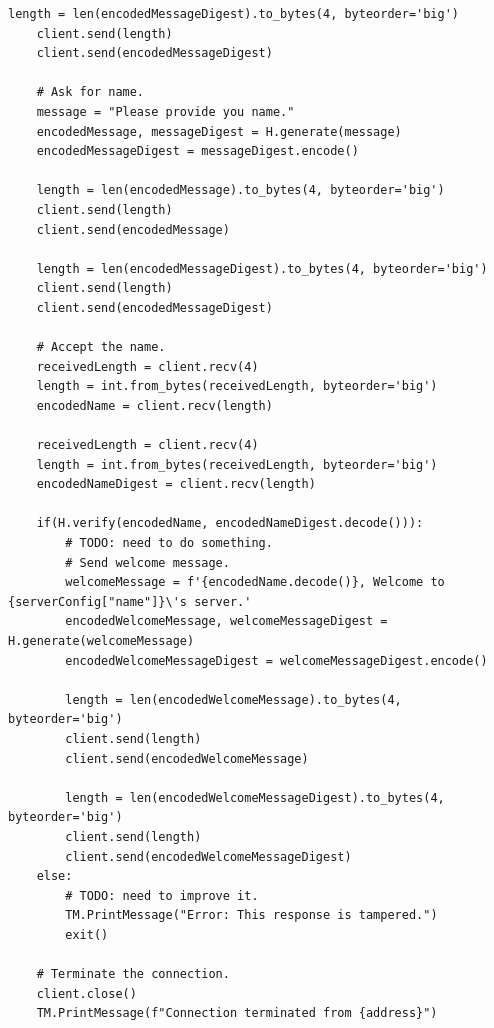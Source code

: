 \begin{lstlisting}[style=mypython, caption={server.py}, label={code:A-2-a-server}]
    length = len(encodedMessageDigest).to_bytes(4, byteorder='big')
    client.send(length)
    client.send(encodedMessageDigest)

    # Ask for name.
    message = "Please provide you name."
    encodedMessage, messageDigest = H.generate(message)
    encodedMessageDigest = messageDigest.encode()

    length = len(encodedMessage).to_bytes(4, byteorder='big')
    client.send(length)
    client.send(encodedMessage)

    length = len(encodedMessageDigest).to_bytes(4, byteorder='big')
    client.send(length)
    client.send(encodedMessageDigest)

    # Accept the name.
    receivedLength = client.recv(4)
    length = int.from_bytes(receivedLength, byteorder='big')
    encodedName = client.recv(length)

    receivedLength = client.recv(4)
    length = int.from_bytes(receivedLength, byteorder='big')
    encodedNameDigest = client.recv(length)

    if(H.verify(encodedName, encodedNameDigest.decode())):
        # TODO: need to do something.
        # Send welcome message.
        welcomeMessage = f'{encodedName.decode()}, Welcome to {serverConfig["name"]}\'s server.'
        encodedWelcomeMessage, welcomeMessageDigest = H.generate(welcomeMessage)
        encodedWelcomeMessageDigest = welcomeMessageDigest.encode()

        length = len(encodedWelcomeMessage).to_bytes(4, byteorder='big')
        client.send(length)
        client.send(encodedWelcomeMessage)

        length = len(encodedWelcomeMessageDigest).to_bytes(4, byteorder='big')
        client.send(length)
        client.send(encodedWelcomeMessageDigest)
    else:
        # TODO: need to improve it.
        TM.PrintMessage("Error: This response is tampered.")
        exit()

    # Terminate the connection.
    client.close()
    TM.PrintMessage(f"Connection terminated from {address}")
\end{lstlisting}

